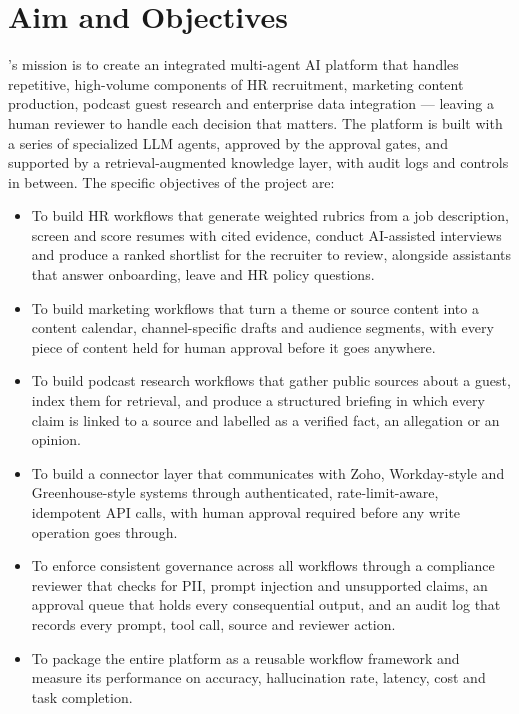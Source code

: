 \section{Aim and Objectives}
\textbf{\ProjectTitle}'s mission is to create an integrated multi-agent AI platform that handles repetitive, high-volume components of HR recruitment, marketing content production, podcast guest research and enterprise data integration — leaving a human reviewer to handle each decision that matters. The platform is built with a series of specialized LLM agents, approved by the approval gates, and supported by a retrieval-augmented knowledge layer, with audit logs and controls in between.
\vspace{12pt}
The specific objectives of the project are:
\begin{itemize}
  \item To build HR workflows that generate weighted rubrics from a job description, screen and score resumes with cited evidence, conduct AI-assisted interviews and produce a ranked shortlist for the recruiter to review, alongside assistants that answer onboarding, leave and HR policy questions.
  \item To build marketing workflows that turn a theme or source content into a content calendar, channel-specific drafts and audience segments, with every piece of content held for human approval before it goes anywhere.
  \item To build podcast research workflows that gather public sources about a guest, index them for retrieval, and produce a structured briefing in which every claim is linked to a source and labelled as a verified fact, an allegation or an opinion.
  \item To build a connector layer that communicates with Zoho, Workday-style and Greenhouse-style systems through authenticated, rate-limit-aware, idempotent API calls, with human approval required before any write operation goes through.
  \item To enforce consistent governance across all workflows through a compliance reviewer that checks for PII, prompt injection and unsupported claims, an approval queue that holds every consequential output, and an audit log that records every prompt, tool call, source and reviewer action.
  \item To package the entire platform as a reusable workflow framework and measure its performance on accuracy, hallucination rate, latency, cost and task completion.
\end{itemize}
